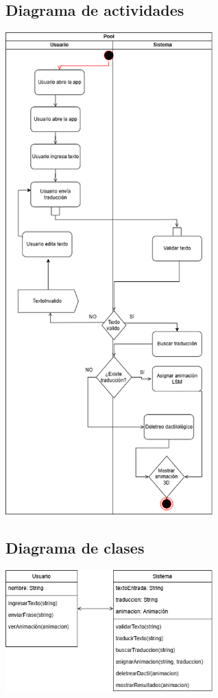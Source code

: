 \subsection{Diagrama de actividades}
\begin{center}
    \includegraphics[width=0.6\textwidth]{Images/Cap 3/actividades.png}
\end{center}

\subsection{Diagrama de clases}
\begin{center}
    \includegraphics[width=0.6\textwidth]{Images/Cap 3/Clases.png}
\end{center}

